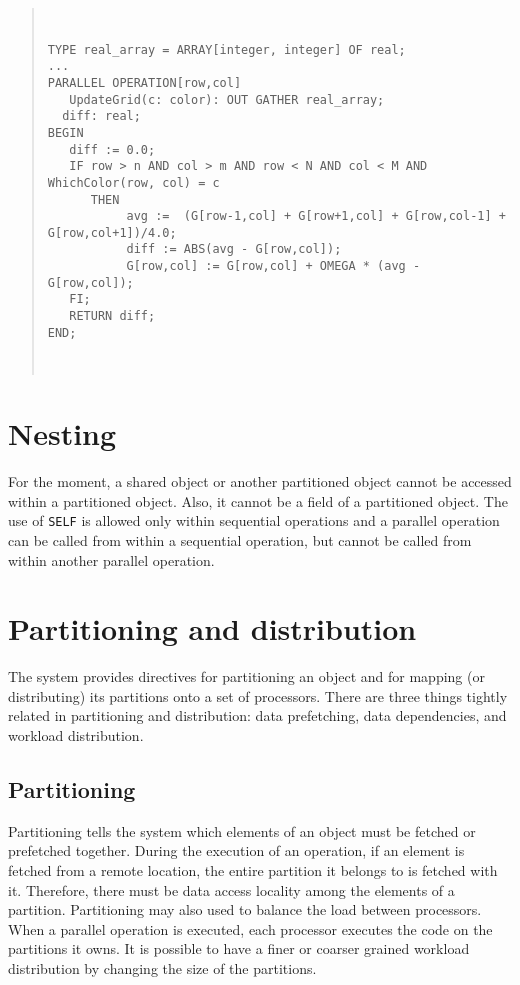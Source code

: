 \documentclass{article}
\newenvironment{example}
  {\begin{quote} ~\hrulefill }
  {~\hrulefill \end{quote} }
\begin{document}
\begin{example} \begin{verbatim}
TYPE real_array = ARRAY[integer, integer] OF real;
...
PARALLEL OPERATION[row,col] 
   UpdateGrid(c: color): OUT GATHER real_array;
  diff: real;
BEGIN
   diff := 0.0; 
   IF row > n AND col > m AND row < N AND col < M AND WhichColor(row, col) = c 
      THEN
           avg :=  (G[row-1,col] + G[row+1,col] + G[row,col-1] + G[row,col+1])/4.0; 
           diff := ABS(avg - G[row,col]); 
           G[row,col] := G[row,col] + OMEGA * (avg - G[row,col]);
   FI;
   RETURN diff;
END; 
\end{verbatim} \end{example}

\section{Nesting}
\label{nesting}

For the moment, a shared object or another partitioned object cannot
be accessed within a partitioned object. Also, it cannot be a field of
a partitioned object. The use of \verb+SELF+ is allowed only within
sequential operations and a parallel operation can be called from
within a sequential operation, but cannot be called from within
another parallel operation.

\section{Partitioning and distribution}
\label{partitioning} 

The system provides directives for partitioning an object and for
mapping (or distributing) its partitions onto a set of
processors. There are three things tightly related in partitioning and
distribution: data prefetching, data dependencies, and workload
distribution.

\subsection{Partitioning} 

Partitioning tells the system which elements of an object must be
fetched or prefetched together. During the execution of an operation,
if an element is fetched from a remote location, the entire partition
it belongs to is fetched with it. Therefore, there must be data access
locality among the elements of a partition. Partitioning may also used
to balance the load between processors. When a parallel operation is
executed, each processor executes the code on the partitions it
owns. It is possible to have a finer or coarser grained workload
distribution by changing the size of the partitions.
\end{document}
